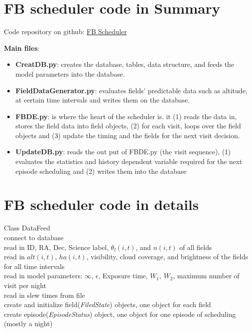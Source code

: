 \documentclass[]{spie}  %
\theoremstyle{definition}
\begin{document}
\section{FB scheduler code in Summary}\label{sec:intro}  
Code repository on github: \href{https://github.com/elahesadatnaghib/LSSTschedulerV2} {FB Scheduler}

\textbf{Main files}:
\begin{itemize}
\item \textbf{CreatDB.py}:  creates the database, tables, data structure, and feeds the model parameters into the database.
\item \textbf{FieldDataGenerator.py}: evaluates  fields' predictable data such as altitude, at certain time intervals and writes them on the database. 
\item \textbf{FBDE.py}: is where the heart of the scheduler is. it (1) reads the data in, stores the field data into field objects, (2) for each visit, loops over the field objects and (3) update the timing and the fields for the next visit decision.
\item \textbf{UpdateDB.py}: reads the out put of FBDE.py (the visit sequence), (1) evaluates the statistics and history dependent variable required for the next episode scheduling and (2) writes them into the database 
\end{itemize}

\newpage
\section{FB scheduler code in details}
\vspace{1cm}

Class DataFeed\\
\indent connect to database \\
\indent read in ID, RA, Dec, Science label, $\theta_{l}(i,t)$, and $n(i,t)$ of all fields\\
\indent read in $alt(i,t)$, $ha(i,t)$, visibility, cloud coverage, and brightness of the fields for all time intervals\\
\indent read in model parameters: $\infty$, $\epsilon$, Exposure time, $W_1,~W_2$, maximum number of visit per night\\
\indent read in slew times from file\\
\indent create and initialize field(\textit{FiledState}) objects, one object for each field\\
\indent create episode(\textit{EpisodeStatus}) object, one object for one episode of scheduling (mostly a night)\\
\end{document}

